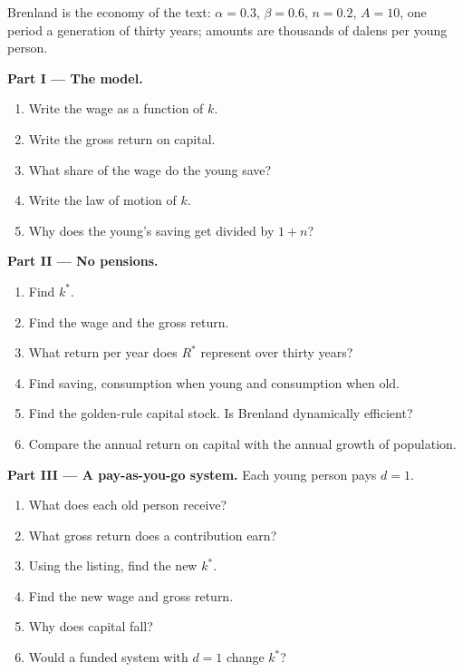 \begin{problem}
\label{pb:b2:overlapping-generations:1}
Brenland is the economy of the text: $\alpha = 0.3$, $\beta = 0.6$, $n = 0.2$, $A = 10$, one period a generation of thirty years; amounts are thousands of dalens per
young person.

\medskip
\noindent\textbf{Part I --- The model.}
\begin{enumerate}
  \item Write the wage as a function of $k$.
  \item Write the gross return on capital.
  \item What share of the wage do the young save?
  \item Write the law of motion of $k$.
  \item Why does the young's saving get divided by $1 + n$?
\end{enumerate}

\medskip
\noindent\textbf{Part II --- No pensions.}
\begin{enumerate}[resume]
  \item Find $k^*$.
  \item Find the wage and the gross return.
  \item What return per year does $R^*$ represent over thirty years?
  \item Find saving, consumption when young and consumption when old.
  \item Find the golden-rule capital stock. Is Brenland dynamically efficient?
  \item Compare the annual return on capital with the annual growth of population.
\end{enumerate}

\medskip
\noindent\textbf{Part III --- A pay-as-you-go system.} Each young person pays $d = 1$.
\begin{enumerate}[resume]
  \item What does each old person receive?
  \item What gross return does a contribution earn?
  \item Using the listing, find the new $k^*$.
  \item Find the new wage and gross return.
  \item Why does capital fall?
  \item Would a funded system with $d = 1$ change $k^*$?
\end{enumerate}


\end{problem}
